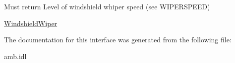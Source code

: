 Must return Level of windshield whiper speed (see W\-I\-P\-E\-R\-S\-P\-E\-E\-D) 

\hyperlink{interfaceVehicle_1_1org_1_1automotive_1_1WindshieldWiper}{Windshield\-Wiper} 

The documentation for this interface was generated from the following file\-:\begin{DoxyCompactItemize}
\item 
amb.\-idl\end{DoxyCompactItemize}
